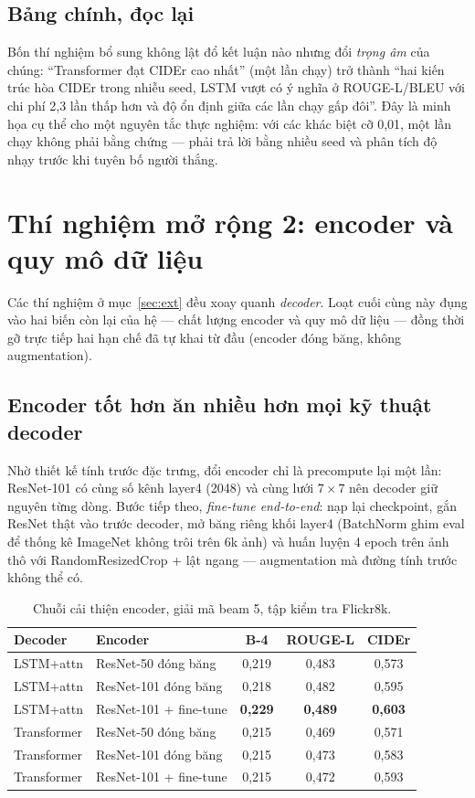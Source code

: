 \subsection{Bảng chính, đọc lại}

Bốn thí nghiệm bổ sung không lật đổ kết luận nào nhưng đổi \emph{trọng âm} của
chúng: ``Transformer đạt CIDEr cao nhất'' (một lần chạy) trở thành ``hai kiến
trúc hòa CIDEr trong nhiễu seed, LSTM vượt có ý nghĩa ở ROUGE-L/BLEU với chi
phí 2,3 lần thấp hơn và độ ổn định giữa các lần chạy gấp đôi''. Đây là minh họa
cụ thể cho một nguyên tắc thực nghiệm: với các khác biệt cỡ 0,01, một lần chạy
không phải bằng chứng --- phải trả lời bằng nhiều seed và phân tích độ nhạy
trước khi tuyên bố người thắng.

\section{Thí nghiệm mở rộng 2: encoder và quy mô dữ liệu}
\label{sec:ext2}

Các thí nghiệm ở mục~\ref{sec:ext} đều xoay quanh \emph{decoder}. Loạt cuối
cùng này đụng vào hai biến còn lại của hệ --- chất lượng encoder và quy mô dữ
liệu --- đồng thời gỡ trực tiếp hai hạn chế đã tự khai từ đầu (encoder đóng
băng, không augmentation).

\subsection{Encoder tốt hơn ăn nhiều hơn mọi kỹ thuật decoder}

Nhờ thiết kế tính trước đặc trưng, đổi encoder chỉ là precompute lại một lần:
ResNet-101 có cùng số kênh layer4 (2048) và cùng lưới $7\times 7$ nên decoder
giữ nguyên từng dòng. Bước tiếp theo, \emph{fine-tune end-to-end}: nạp lại
checkpoint, gắn ResNet thật vào trước decoder, mở băng riêng khối layer4
(BatchNorm ghim eval để thống kê ImageNet không trôi trên 6k ảnh) và huấn luyện
4 epoch trên ảnh thô với RandomResizedCrop + lật ngang --- augmentation mà
đường tính trước không thể có.

\begin{table}[H]
	\centering
	\caption{Chuỗi cải thiện encoder, giải mã beam 5, tập kiểm tra Flickr8k.}
	\label{tab:encoder-chain}
	\begin{tabular}{llccc}
		\hline
		\textbf{Decoder} & \textbf{Encoder} & \textbf{B-4} & \textbf{ROUGE-L} & \textbf{CIDEr} \\
		\hline
		LSTM+attn & ResNet-50 đóng băng      & 0,219 & 0,483 & 0,573 \\
		LSTM+attn & ResNet-101 đóng băng     & 0,218 & 0,482 & 0,595 \\
		LSTM+attn & ResNet-101 + fine-tune   & \textbf{0,229} & \textbf{0,489} & \textbf{0,603} \\
		\hline
		Transformer & ResNet-50 đóng băng    & 0,215 & 0,469 & 0,571 \\
		Transformer & ResNet-101 đóng băng   & 0,215 & 0,473 & 0,583 \\
		Transformer & ResNet-101 + fine-tune & 0,215 & 0,472 & 0,593 \\
		\hline
	\end{tabular}
\end{table}


